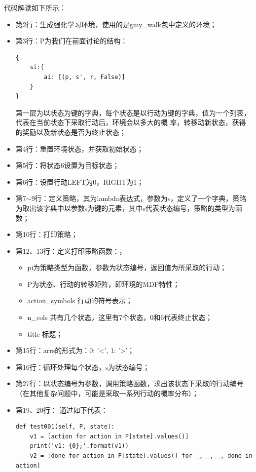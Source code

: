 代码解读如下所示：
\begin{itemize}
    \item 第2行：生成强化学习环境，使用的是gmy\_walk包中定义的环境；
    \item 第3行：P为我们在前面讨论的结构：
\begin{lstlisting}
{
    si:{
        ai: [(p, s', r, False)]
    }
}
\end{lstlisting}

第一层为以状态为键的字典，每个状态是以行动为键的字典，值为一个列表，代表在当前状态下采取行动后，环境会以多大的概
率，转移动新状态，获得的奖励以及新状态是否为终止状态；
\item 第4行：重置环境状态，并获取初始状态；
\item 第5行：将状态6设置为目标状态；
\item 第6行：设置行动LEFT为0，RIGHT为1；
\item 第7$\sim$9行：定义策略，其为lambda表达式，参数为s，定义了一个字典，策略为取出该字典中以参数s为键的元素，其中s代表状态编号，策略的类型为函数；
\item 第10行：打印策略；
\item 第12、13行：定义打印策略函数：，
\begin{itemize}
    \item pi为策略类型为函数，参数为状态编号，返回值为所采取的行动；
    \item P为状态、行动的转移矩阵，即环境的MDP特性；
    \item action\_symbols 行动的符号表示；
    \item n\_cols 共有几个状态，这里有7个状态，0和6代表终止状态；
    \item title 标题；
\end{itemize}
\item 第15行：arrs的形式为：{0: '<', 1: '>'}；
\item 第16行：循环处理每个状态，s为状态编号；
\item 第27行：以状态编号为参数，调用策略函数，求出该状态下采取的行动编号（在其他复杂问题中，可能是采取一系列行动的概率分布）；
\item 第19、20行：
通过如下代表：
\begin{lstlisting}
def test001(self, P, state):
    v1 = [action for action in P[state].values()]
    print('v1: {0};'.format(v1))
    v2 = [done for action in P[state].values() for _, _, _, done in action]

\end{lstlisting}
\end{itemize}
